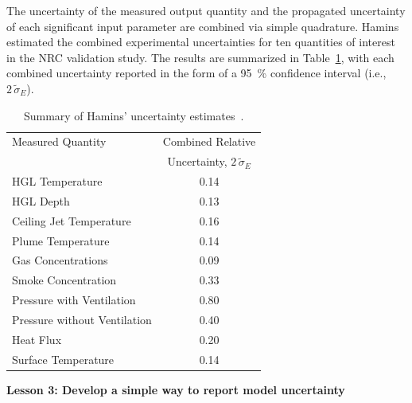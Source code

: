 \documentclass[fleqn,b5paper]{article}
\begin{document}
The uncertainty of the measured output quantity and the propagated uncertainty of each significant input parameter are combined via simple quadrature.  Hamins estimated the combined experimental uncertainties for ten quantities of interest in the NRC validation study. The results are summarized in Table~\ref{Uncertainty}, with each combined uncertainty reported in the form of a 95~\% confidence interval (i.e., $2 \, \widetilde{\sigma}_E$).
\begin{table}[ht]
\caption{Summary of Hamins' uncertainty estimates~\cite{NUREG_1824}. }
\begin{center}
\begin{tabular}{|l|c|}
\hline
Measured Quantity               & Combined Relative       \\
                                & Uncertainty, $2 \, \widetilde{\sigma}_E$       \\ \hline \hline
HGL Temperature                 & 0.14    \\ \hline
HGL Depth                       & 0.13    \\ \hline
Ceiling Jet Temperature         & 0.16    \\ \hline
Plume Temperature               & 0.14    \\ \hline
Gas Concentrations              & 0.09    \\ \hline
Smoke Concentration             & 0.33    \\ \hline
Pressure with Ventilation       & 0.80    \\ \hline
Pressure without Ventilation    & 0.40    \\ \hline
Heat Flux                       & 0.20    \\ \hline
Surface Temperature             & 0.14    \\ \hline
\end{tabular}
\end{center}
\label{Uncertainty}
\end{table}



\vspace{\parskip}
{\bf Lesson 3: Develop a simple way to report model uncertainty}
\end{document}
